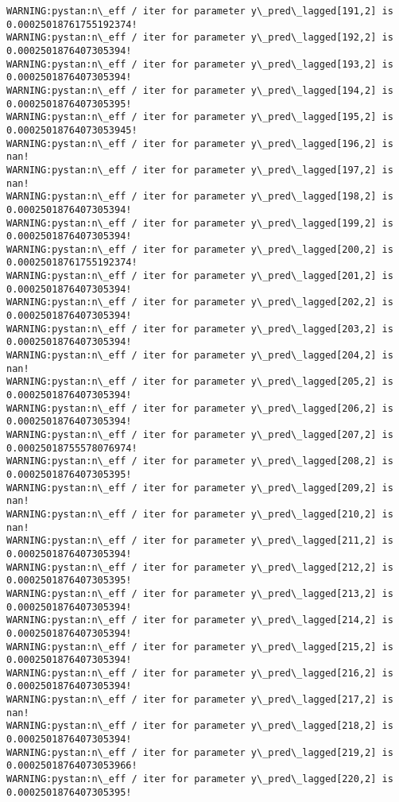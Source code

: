 \documentclass[11pt]{article}
\begin{document}
\begin{Verbatim}[commandchars=\\\{\}]
WARNING:pystan:n\_eff / iter for parameter y\_pred\_lagged[191,2] is 0.00025018761755192374!
WARNING:pystan:n\_eff / iter for parameter y\_pred\_lagged[192,2] is 0.0002501876407305394!
WARNING:pystan:n\_eff / iter for parameter y\_pred\_lagged[193,2] is 0.0002501876407305394!
WARNING:pystan:n\_eff / iter for parameter y\_pred\_lagged[194,2] is 0.0002501876407305395!
WARNING:pystan:n\_eff / iter for parameter y\_pred\_lagged[195,2] is 0.00025018764073053945!
WARNING:pystan:n\_eff / iter for parameter y\_pred\_lagged[196,2] is nan!
WARNING:pystan:n\_eff / iter for parameter y\_pred\_lagged[197,2] is nan!
WARNING:pystan:n\_eff / iter for parameter y\_pred\_lagged[198,2] is 0.0002501876407305394!
WARNING:pystan:n\_eff / iter for parameter y\_pred\_lagged[199,2] is 0.0002501876407305394!
WARNING:pystan:n\_eff / iter for parameter y\_pred\_lagged[200,2] is 0.00025018761755192374!
WARNING:pystan:n\_eff / iter for parameter y\_pred\_lagged[201,2] is 0.0002501876407305394!
WARNING:pystan:n\_eff / iter for parameter y\_pred\_lagged[202,2] is 0.0002501876407305394!
WARNING:pystan:n\_eff / iter for parameter y\_pred\_lagged[203,2] is 0.0002501876407305394!
WARNING:pystan:n\_eff / iter for parameter y\_pred\_lagged[204,2] is nan!
WARNING:pystan:n\_eff / iter for parameter y\_pred\_lagged[205,2] is 0.0002501876407305394!
WARNING:pystan:n\_eff / iter for parameter y\_pred\_lagged[206,2] is 0.0002501876407305394!
WARNING:pystan:n\_eff / iter for parameter y\_pred\_lagged[207,2] is 0.00025018755578076974!
WARNING:pystan:n\_eff / iter for parameter y\_pred\_lagged[208,2] is 0.0002501876407305395!
WARNING:pystan:n\_eff / iter for parameter y\_pred\_lagged[209,2] is nan!
WARNING:pystan:n\_eff / iter for parameter y\_pred\_lagged[210,2] is nan!
WARNING:pystan:n\_eff / iter for parameter y\_pred\_lagged[211,2] is 0.0002501876407305394!
WARNING:pystan:n\_eff / iter for parameter y\_pred\_lagged[212,2] is 0.0002501876407305395!
WARNING:pystan:n\_eff / iter for parameter y\_pred\_lagged[213,2] is 0.0002501876407305394!
WARNING:pystan:n\_eff / iter for parameter y\_pred\_lagged[214,2] is 0.0002501876407305394!
WARNING:pystan:n\_eff / iter for parameter y\_pred\_lagged[215,2] is 0.0002501876407305394!
WARNING:pystan:n\_eff / iter for parameter y\_pred\_lagged[216,2] is 0.0002501876407305394!
WARNING:pystan:n\_eff / iter for parameter y\_pred\_lagged[217,2] is nan!
WARNING:pystan:n\_eff / iter for parameter y\_pred\_lagged[218,2] is 0.0002501876407305394!
WARNING:pystan:n\_eff / iter for parameter y\_pred\_lagged[219,2] is 0.00025018764073053966!
WARNING:pystan:n\_eff / iter for parameter y\_pred\_lagged[220,2] is 0.0002501876407305395!

\end{Verbatim}
\end{document}
